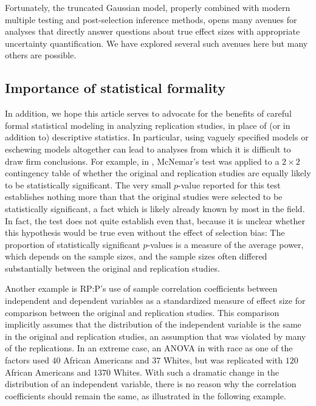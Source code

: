 \documentclass[aoas, preprint]{imsart}
\theoremstyle{definition}
\theoremstyle{custom}
\begin{document}
  Fortunately, the truncated Gaussian model, properly combined with modern multiple testing and post-selection inference methods, opens many avenues for analyses that directly answer questions about true effect sizes with appropriate uncertainty quantification. We have explored several such avenues here \citep[see also][]{Andrews:2018vh} but many others are possible.

\subsection{Importance of statistical formality}

  In addition, we hope this article serves to advocate for the benefits of careful formal statistical modeling in analyzing replication studies, in place of (or in addition to) descriptive statistics. In particular, using vaguely specified models or eschewing models altogether can lead to analyses from which it is difficult to draw firm conclusions. For example, in \citet{OpenScienceCollaboration:2015cn}, McNemar's test was applied to a $2 \times 2$ contingency table of whether the original and replication studies are equally likely to be statistically significant. The very small $p$-value reported for this test establishes nothing more than that the original studies were selected to be statistically significant, a fact which is likely already known by most in the field. In fact, the test does not quite establish even that, because it is unclear whether this hypothesis would be true even without the effect of selection bias: The proportion of statistically significant $p$-values is a measure of the average power, which depends on the sample sizes, and the sample sizes often differed substantially between the original and replication studies.

  Another example is RP:P's use of sample correlation coefficients between independent and dependent variables as a standardized measure of effect size for comparison between the original and replication studies. This comparison implicitly assumes that the distribution of the independent variable is the same in the original and replication studies, an assumption that was violated by many of the replications. In an extreme case, an ANOVA in \citet{PurdieVaughns:2008en} with race as one of the factors used $40$ African Americans and $37$ Whites, but was replicated with $120$ African Americans and $1370$ Whites. With such a dramatic change in the distribution of an independent variable, there is no reason why the correlation coefficients should remain the same, as illustrated in the following example.
\end{document}
